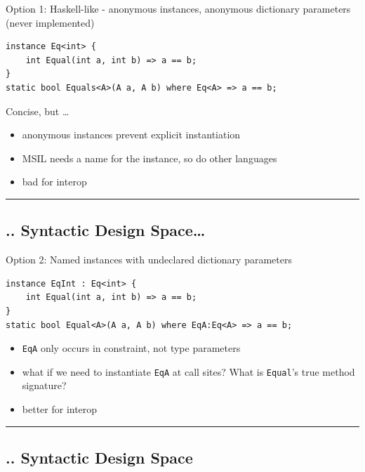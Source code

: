 Option 1: Haskell-like - anonymous instances, anonymous dictionary
parameters (never implemented)

\begin{lstlisting}
instance Eq<int> {
    int Equal(int a, int b) => a == b;
}
static bool Equals<A>(A a, A b) where Eq<A> => a == b;
\end{lstlisting}

Concise, but \ldots{}

\begin{itemize}
\tightlist
\item
  anonymous instances prevent explicit instantiation
\item
  MSIL needs a name for the instance, so do other languages
\item
  bad for interop
\end{itemize}

\begin{center}\rule{0.5\linewidth}{\linethickness}\end{center}

\subsection{.. Syntactic Design
Space\ldots{}}\label{syntactic-design-space-1}

Option 2: Named instances with undeclared dictionary parameters

\begin{lstlisting}
instance EqInt : Eq<int> {
    int Equal(int a, int b) => a == b;
}
static bool Equal<A>(A a, A b) where EqA:Eq<A> => a == b;
\end{lstlisting}

\begin{itemize}
\tightlist
\item
  \lstinline!EqA! only occurs in constraint, not type parameters
\item
  what if we need to instantiate \lstinline!EqA! at call sites? What is
  \lstinline!Equal!'s true method signature?
\item
  better for interop
\end{itemize}

\begin{center}\rule{0.5\linewidth}{\linethickness}\end{center}

\subsection{.. Syntactic Design Space}\label{syntactic-design-space-2}

